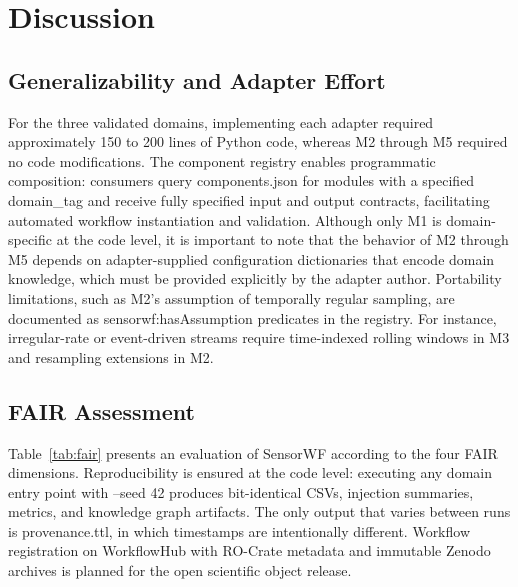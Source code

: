 \documentclass[conference]{IEEEtran}
\begin{document}

\section{Discussion}

\subsection{Generalizability and Adapter Effort}

For the three validated domains, implementing each adapter required approximately 150 to 200 lines of Python code, whereas M2 through M5 required no code modifications. The component registry enables programmatic composition: consumers query components.json for modules with a specified domain_tag and receive fully specified input and output contracts, facilitating automated workflow instantiation and validation. Although only M1 is domain-specific at the code level, it is important to note that the behavior of M2 through M5 depends on adapter-supplied configuration dictionaries that encode domain knowledge, which must be provided explicitly by the adapter author. Portability limitations, such as M2's assumption of temporally regular sampling, are documented as sensorwf:hasAssumption predicates in the registry. For instance, irregular-rate or event-driven streams require time-indexed rolling windows in M3 and resampling extensions in M2.

\subsection{FAIR Assessment}

Table~\ref{tab:fair} presents an evaluation of SensorWF according to the four FAIR dimensions. Reproducibility is ensured at the code level: executing any domain entry point with --seed 42 produces bit-identical CSVs, injection summaries, metrics, and knowledge graph artifacts. The only output that varies between runs is provenance.ttl, in which timestamps are intentionally different. Workflow registration on WorkflowHub with RO-Crate metadata and immutable Zenodo archives is planned for the open scientific object release.
\end{document}
